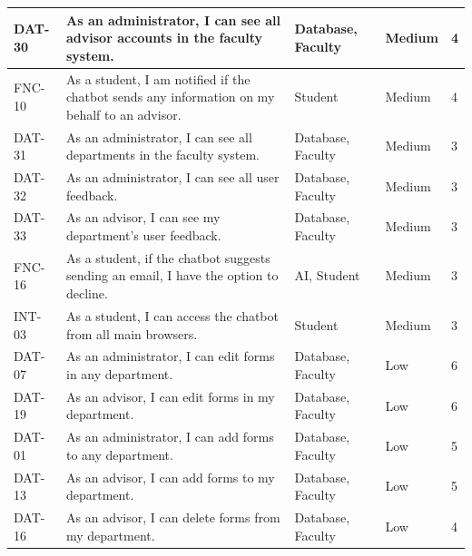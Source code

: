 \documentclass[titlepage, 12pt]{article}
\begin{document}
\begin{center}
\begin{longtable}{ L{1.5cm} L{4cm} L{3cm} L{1.5cm} L{1.5cm} }
\midrule
DAT-30 & As an administrator, I can see all advisor accounts in the faculty system.                                                        & Database, Faculty     & Medium & 4  \\
\midrule
FNC-10 & As a student, I am notified if the chatbot sends any information on my behalf to an advisor.                                      & Student               & Medium & 4  \\
\midrule
DAT-31 & As an administrator, I can see all departments in the faculty system.                                                             & Database, Faculty     & Medium & 3  \\
\midrule
DAT-32 & As an administrator, I can see all user feedback.                                                                                 & Database, Faculty     & Medium & 3  \\
\midrule
DAT-33 & As an advisor, I can see my department's user feedback.                                                                           & Database, Faculty     & Medium & 3  \\
\midrule
FNC-16 & As a student, if the chatbot suggests sending an email, I have the option to decline.                                             & AI, Student           & Medium & 3  \\
\midrule
INT-03 & As a student, I can access the chatbot from all main browsers.                                                                    & Student               & Medium & 3  \\
\midrule
DAT-07 & As an administrator, I can edit forms in any department.                                                                          & Database, Faculty     & Low    & 6  \\
\midrule
DAT-19 & As an advisor, I can edit forms in my department.                                                                                 & Database, Faculty     & Low    & 6  \\
\midrule
DAT-01 & As an administrator, I can add forms to any department.                                                                           & Database, Faculty     & Low    & 5  \\
\midrule
DAT-13 & As an advisor, I can add forms to my department.                                                                                  & Database, Faculty     & Low    & 5  \\
\midrule
DAT-16 & As an advisor, I can delete forms from my department.                                                                             & Database, Faculty     & Low    & 4  \\

\end{longtable}
\end{center}
\end{document}
